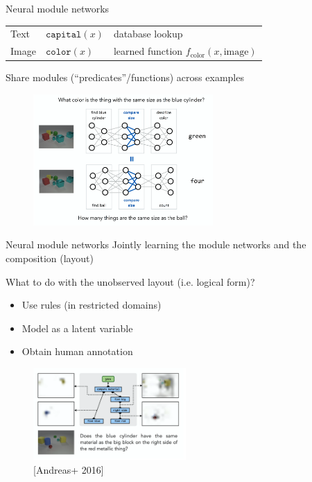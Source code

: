 \documentclass[usenames,dvipsnames,11pt,aspectratio=169]{beamer}
\begin{document}
\begin{frame}
    {Neural module networks}
    \begin{tabular}{lll}
        Text& $\texttt{capital}(x)$ & database lookup \\
        Image& $\texttt{color}(x)$ & learned function $f_{\text{color}}(x, \text{image})$
    \end{tabular}

    Share modules (``predicates''/functions) across examples

    \vspace{-1em}
    \begin{figure}
        \includegraphics[height=5cm]{figures/nmn-ex2}
    \end{figure}
\end{frame}

\begin{frame}
    {Neural module networks}
    Jointly learning the module networks and the composition (layout)

    What to do with the unobserved layout (i.e. logical form)?\\
            \begin{itemize}
                \item Use rules (in restricted domains) 
                \item Model as a latent variable
                \item Obtain human annotation
            \end{itemize}

    \vspace{-1em}
    \begin{figure}
        \includegraphics[height=3.5cm]{figures/nmn-ex3}
        \caption{[Andreas+ 2016]}
    \end{figure}
    \vspace{-1em}
\end{frame}
\end{document}
